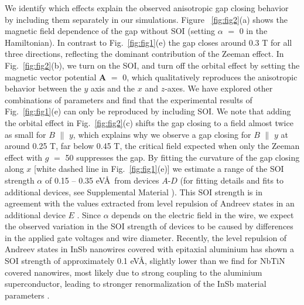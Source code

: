 We identify which effects explain the observed anisotropic gap closing behavior by including them separately in our simulations.
Figure ~\ref{fig:fig2}(a) shows the magnetic field dependence of the gap without SOI (setting $\alpha$ $=$ 0 in the Hamiltonian).
In contrast to Fig.~\ref{fig:fig1}(e) the gap closes around 0.3 T for all three directions, reflecting the dominant contribution of the Zeeman effect.  %
In Fig.~\ref{fig:fig2}(b), we turn on the SOI, and turn off the orbital effect by setting the magnetic vector potential $\mathbf{A}$ $=$ 0, which qualitatively reproduces the anisotropic behavior between the $y$ axis and the $x$ and $z$-axes.  %
We have explored other combinations of parameters and find that the experimental results of Fig.~\ref{fig:fig1}(e) can only be reproduced by including SOI.  %
We note that adding the orbital effect in Fig.~\ref{fig:fig2}(c) shifts the gap closing to a field almost twice as small for $B$ $\parallel$ $y$, which explains why we observe a gap closing for $B$ $\parallel$ $y$ at around 0.25 T, far below 0.45 T, the critical field expected when only the Zeeman effect with $g$ $=$ 50 suppresses the gap.  %
By fitting the curvature of the gap closing \cite{Heck2017,Pan2019} along $x$ [white dashed line in Fig.~\ref{fig:fig1}(e)] we estimate a range of the SOI strength $\alpha$ of 0.15 -- 0.35 eV\AA\ from devices $A$-$D$ (for fitting details and fits to additional devices, see Supplemental Material \cite{Note1}).  %
This SOI strength is in \mbox{agreement} with the values extracted from level repulsion of Andreev states \cite{Stanescu2013,Moor2018} in an additional device $E$ \cite{Note1}.  %
\mbox{Since} $\alpha$ depends on the electric field in the wire, we expect the observed variation in the SOI strength of devices to be caused by differences in the applied gate voltages and wire diameter.
Recently, the level repulsion of Andreev states in InSb nanowires covered with epitaxial aluminium has shown a SOI strength of approximately 0.1 eV\AA \cite{Moor2018}, slightly lower than we find for NbTiN covered nanowires, most likely due to strong coupling to the aluminium superconductor, leading to stronger renormalization of the InSb material parameters \cite{Stanescu2011,Cole2015,Antipov2018,Woods2018,Mikkelsen2018,Reeg2018}.

